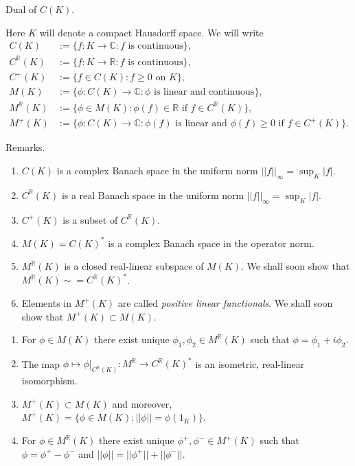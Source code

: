 
Dual of $C(K)$.

Here $K$ will denote a compact Hausdorff space.
We will write
\begin{align*}
  C(K)&:=\{f:K\to\mathbb{C}:\text{$f$ is continuous}\},\\
  C^\mathbb{R}(K)&:=\{f:K\to\mathbb{R}:\text{$f$ is continuous}\},\\
  C^+(K)&:=\{f\in C(K):\text{$f\geq 0$ on $K$}\},\\
  M(K)&:=\{\phi: C(K)\to\mathbb{C}:\text{$\phi$ is linear and continuous}\},\\
  M^\mathbb{R}(K)&:=\{\phi\in M(K):\text{$\phi(f)\in \mathbb{R}$ if $f\in C^\mathbb{R}(K)$}\},\\
  M^+(K)&:=\{\phi: C(K)\to\mathbb{C}:\text{$\phi(f)$ is linear and $\phi(f)\geq 0$ if $f\in C^+(K)$}\}.
\end{align*}

Remarks.
\begin{enumerate}
  \item $C(K)$ is a complex Banach space in the uniform norm $||f||_\infty=\sup_K |f|$.
  \item $C^\mathbb{R}(K)$ is a real Banach space in the uniform norm $||f||_\infty=\sup_K |f|$.
  \item $C^+(K)$ is a subset of $C^\mathbb{R}(K)$.
  \item $M(K)=C(K)^*$ is a complex Banach space in the operator norm.
  \item $M^\mathbb{R}(K)$ is a closed real-linear subspace of $M(K)$.
  We shall soon show that  $M^\mathbb{R}(K)\sim = C^\mathbb{R}(K)^*$.
  \item Elements in $M^+(K)$ are called \emph{positive linear functionals}.
  We shall soon show that $M^+(K)\subset M(K)$.
\end{enumerate}

\begin{lemma}
\begin{enumerate}
  \item For $\phi\in M(K)$ there exist unique $\phi_1,\phi_2\in M^{\mathbb{R}}(K)$
  such that $\phi = \phi_1+i\phi_2$.
  \item The map $\phi\mapsto \phi|_{C^\mathbb{R}(K)}:M^\mathbb{R}\to C^\mathbb{R}(K)^*$
  is an isometric, real-linear isomorphism.
  \item $M^+(K)\subset M(K)$ and moreover,
  $M^+(K)=\{\phi\in M(K):||\phi||=\phi(1_K)\}$.
  \item For $\phi\in M^\mathbb{R}(K)$ there exist unique $\phi^+,\phi^-\in M^+(K)$
  such that $\phi=\phi^+-\phi^-$ and $||\phi||=||\phi^+||+||\phi^-||$.
\end{enumerate}
\end{lemma}

